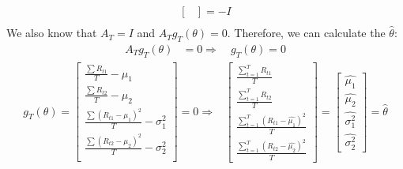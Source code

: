 \begin{enumerate}[(a)]
\begin{equation*}
\begin{aligned}
\begin{bmatrix}
    \end{bmatrix} = -I\\
  \end{aligned}
\end{equation*}
We also know that $A_T = I$ and $A_T g_T(\theta) = 0$. Therefore, we can calculate the $\hat{\theta}$:
\begin{equation*}
  \begin{aligned}
    A_T g_T(\theta) & = 0 \Rightarrow \quad g_T(\theta) =  0 
  \end{aligned}
\end{equation*}
\begin{equation*}
  \begin{aligned}
    g_T(\theta) = \begin{bmatrix}
      \frac{\sum R_{t1}}{T} - \mu_1 \\
      \frac{\sum R_{t2}}{T} - \mu_2\\
       \frac{\sum (R_{t1} - \mu_1)^2 }{T}- \sigma_1^2 \\
      \frac{\sum (R_{t2}- \mu_2)^2}{T}  - \sigma_2^2\\
  \end{bmatrix} = 0 \Rightarrow &  \begin{bmatrix}
      \frac{\sum_{t=1}^T R_{t1}}{T} \\
      \frac{\sum_{t=1}^T R_{t2}}{T} \\
      \frac{\sum_{t=1}^T (R_{t1} - \hat{\mu_1})^2}{T} \\
      \frac{\sum_{t=1}^T (R_{t2} - \hat{\mu_2})^2}{T}
    \end{bmatrix} = \begin{bmatrix}
      \hat{\mu_1} \\
      \hat{\mu_2} \\
      \hat{\sigma_1^2} \\
      \hat{\sigma_2^2}
    \end{bmatrix} = \hat{\theta} \\
  \end{aligned}
\end{equation*}
\end{enumerate}



